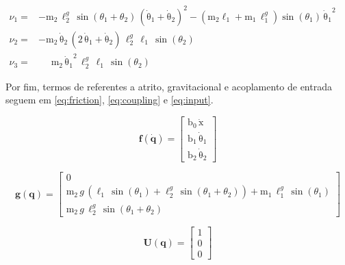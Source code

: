 \documentclass[a4paper, twoside, fleqn]{article}
\begin{document}
    \begin{equation}
        \begin{aligned}
             \nu_1 = & -\mathrm{m_2} \, \ell_{2}^g\, \sin\!\left(\theta_1 + \theta_2\right)\, (\mathrm{\dot \theta_1} + \mathrm{\dot \theta_2})^2 - (\mathrm{m_2} \mathrm{\ell_1} + \mathrm{m_1}\,\ell_{1}^g)\sin\!\left(\theta_1\right)\, {\mathrm{\dot \theta_1}}^2\\ 
             \nu_2 = & - \mathrm{m_2}\, \mathrm{\dot \theta_2}\, \left(2\, \mathrm{\dot \theta_1} + \mathrm{\dot \theta_2}\right) \, \ell_{2}^g\, \mathrm{\ell_1}\, \sin\!\left(\theta_2\right) \\
             \nu_3 = & \,\,\,\,\,\,\,\,\mathrm{m_2}\, {\mathrm{\dot \theta_1}}^2\, \ell_{2}^g\, \mathrm{\ell_1}\, \sin\!\left(\theta_2\right)
        \end{aligned}
        \phantom{\hspace{6cm}}
    \end{equation}
    
    Por fim, termos de referentes a atrito, gravitacional e acoplamento de entrada seguem em \eqref{eq:friction}, \eqref{eq:coupling} e \eqref{eq:input}.  
    
    \begin{equation}
        \mathbf{f}(\mathbf{\dot q}) = 
        \begin{bmatrix} 
        \mathrm{\mathrm{b_0}}\, \mathrm{\dot x}\\ \mathrm{\mathrm{b_1}}\, \mathrm{\dot \theta_1}\\ \mathrm{\mathrm{b_2}}\, \mathrm{\dot \theta_2} 
        \end{bmatrix}
        \label{eq:friction}
    \end{equation}
    
    \begin{equation}
        \mathbf{g}(\mathbf{q}) = 
        \begin{bmatrix} 
        0
        \\ \mathrm{m_2}\, g \,\left(\mathrm{\ell_1}\, \sin\!\left(\theta_1\right) + \ell_{2}^g\, \sin\!\left(\theta_1 + \theta_2\right)\right) + \mathrm{m_1}\, \ell_{1}^g\, \sin\!\left(\theta_1\right)\\ 
        \mathrm{m_2}\, g\, \ell_{2}^g\, \sin\!\left(\theta_1 + \theta_2\right) \end{bmatrix}
    \end{equation}
    
    \begin{equation}
        \mathbf{U}(\mathbf{q}) = \begin{bmatrix}
        1 \\
        0 \\
        0 
        \end{bmatrix}
        \label{eq:coupling}
    \end{equation}
    
\end{document}
